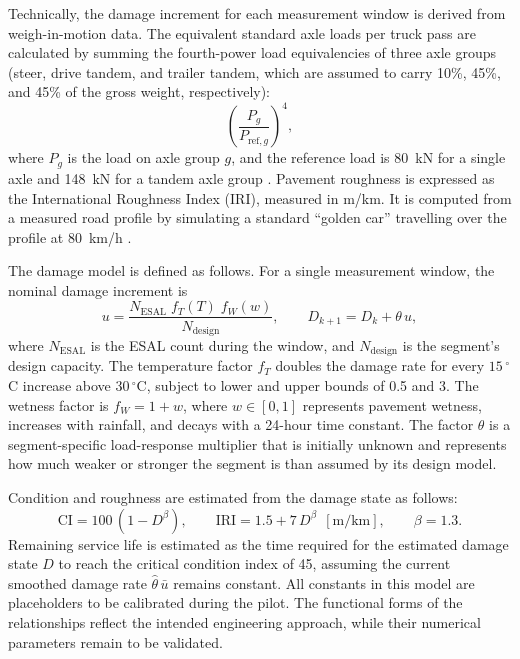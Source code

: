 \documentclass[11pt,a4paper]{article}
\begin{document}
Technically, the damage increment for each measurement window is derived from weigh-in-motion data. The equivalent standard axle loads per truck pass are calculated by summing the fourth-power load equivalencies of three axle groups (steer, drive tandem, and trailer tandem, which are assumed to carry 10\%, 45\%, and 45\% of the gross weight, respectively):
\[
\left(\frac{P_g}{P_{\mathrm{ref},g}}\right)^4,
\]
where $P_g$ is the load on axle group $g$, and the reference load is 80~kN for a single axle and 148~kN for a tandem axle group \cite{aashto}. Pavement roughness is expressed as the International Roughness Index (IRI), measured in m/km. It is computed from a measured road profile by simulating a standard ``golden car'' travelling over the profile at 80~km/h \cite{sayers,astm1926}.

The damage model is defined as follows. For a single measurement window, the nominal damage increment is
\begin{equation}
u=\frac{N_{\mathrm{ESAL}}\;f_T(T)\;f_W(w)}{N_{\mathrm{design}}},\qquad D_{k+1}=D_k+\theta\,u,
\label{eq:damage}
\end{equation}
where $N_{\mathrm{ESAL}}$ is the ESAL count during the window, and $N_{\mathrm{design}}$ is the segment's design capacity. The temperature factor $f_T$ doubles the damage rate for every $15\,^\circ$C increase above $30\,^\circ$C, subject to lower and upper bounds of 0.5 and 3. The wetness factor is $f_W=1+w$, where $w\in[0,1]$ represents pavement wetness, increases with rainfall, and decays with a 24-hour time constant. The factor $\theta$ is a segment-specific load-response multiplier that is initially unknown and represents how much weaker or stronger the segment is than assumed by its design model.

Condition and roughness are estimated from the damage state as follows:
\begin{equation}
\mathrm{CI}=100\,(1-D^{\beta}),\qquad \mathrm{IRI}=1.5+7\,D^{\beta}\ \ [\mathrm{m/km}],\qquad \beta=1.3 .
\label{eq:ci}
\end{equation}
Remaining service life is estimated as the time required for the estimated damage state $D$ to reach the critical condition index of 45, assuming the current smoothed damage rate $\hat\theta\,\bar u$ remains constant. All constants in this model are placeholders to be calibrated during the pilot. The functional forms of the relationships reflect the intended engineering approach, while their numerical parameters remain to be validated.
\end{document}
